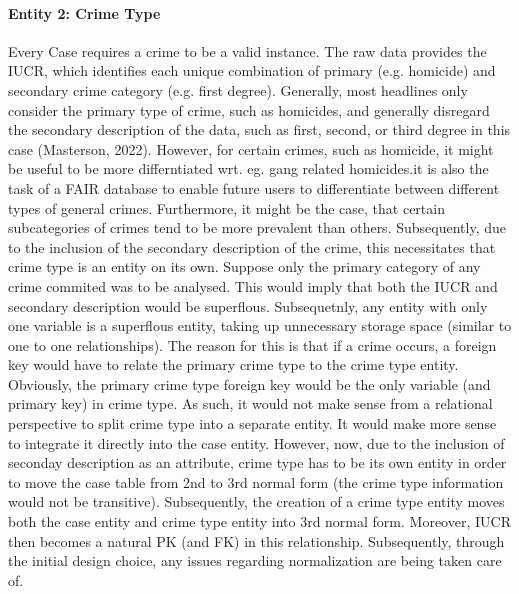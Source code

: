 \documentclass[a4paper]{article}
\begin{document}
\paragraph{Entity 2: Crime Type} Every Case requires a crime to be a valid instance. The raw data provides the IUCR, which identifies each unique combination of primary (e.g. homicide) and secondary crime category (e.g. first degree). Generally, most headlines only consider the primary type of crime, such as homicides, and generally disregard the secondary description of the data, such as first, second, or third degree in this case 
(Masterson, 2022). However, for certain crimes, such as homicide, it might be useful to be more differntiated wrt. eg. gang related homicides.it is also the task of a FAIR database to enable future users to differentiate between different types of general crimes. Furthermore, it might be the case, that certain subcategories of crimes tend to be more prevalent than others.
Subsequently, due to the inclusion of the secondary description of the crime, this necessitates that crime type is an entity on its own. Suppose only the primary category of any crime commited was to be analysed. This would imply that both the IUCR and secondary description would be superflous. Subsequetnly, any entity with only one variable is a superflous entity, taking up unnecessary storage space (similar to one to one relationships). The reason for this is that if a crime occurs, a foreign key would have to relate the primary crime type to the crime type entity. Obviously, the primary crime type foreign key would be the only variable (and primary key) in crime type. As such, it would not make sense from a relational perspective to split crime type into a separate entity. It would make more sense to integrate it directly into the case entity. However, now, due to the inclusion of seconday description as an attribute, crime type has to be its own entity in order to move the case table from 2nd to 3rd normal form (the crime type information would not be transitive). Subsequently, the creation of a crime type entity moves both the case entity and crime type entity into 3rd normal form. Moreover, IUCR then becomes a natural PK (and FK) in this relationship. Subsequently, through the initial design choice, any issues regarding normalization are being taken care of. 
\end{document}
